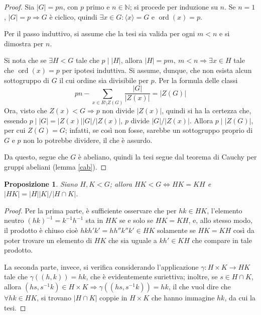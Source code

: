 \documentclass[12pt]{scrartcl}
\theoremstyle{style}
\newtheorem{prop}{Proposizione}[section]
\numberwithin{equation}{subsection}
\begin{document}
	\begin{proof}
		Sia $|G| = pn$, con $p$ primo e $n \in \mathbb{N}$; si procede per induzione su $n$.
		Se $n=1$, $|G| = p \Rightarrow G$ \`e ciclico, quindi $\exists x \in G : \langle x \rangle=G$ e $\operatorname{ord}(x) = p$.

		Per il passo induttivo, si assume che la tesi sia valida per ogni $ m < n$ e si dimostra per $n$.

Si nota che se $\exists  H < G$ tale che $p  \mid  \lvert H \rvert $, allora $|H|=pm , \ m < n \Rightarrow \exists x \in H$ tale che $\operatorname{ord}(x) =p$ per ipotesi induttiva.
Si assume, dunque, che non esista alcun sottogruppo di $G$ il cui ordine sia divisibile per $p$.
Per la formula delle classi
\[
pn - \sum_{x \in R\setminus Z(G)}^{} \frac{\lvert G \rvert }{|Z(x)|} = \lvert Z(G) \rvert 
\] 
Ora, visto che $Z(x) < G \Rightarrow p$ non divide $|Z(x)|$, quindi si ha la certezza che, essendo $p  \mid |G| = |Z(x)| |G|/|Z(x)|$, $p$ divide $|G|/|Z(x)|$. 
Allora $p  \mid  |Z(G)|$, per cui $Z(G) =G$; infatti, se cos\`i non fosse, sarebbe un sottogruppo proprio di $G$ e $p$ non lo potrebbe dividere, il che \`e assurdo.

Da questo, segue che $G$ \`e abeliano, quindi la tesi segue dal teorema di Cauchy per gruppi abeliani (lemma \ref{cab}).
	\end{proof}
\begin{prop}\label{tgen}
Siano $H,K < G$; allora $HK < G \iff HK = KH$ e $\lvert HK \rvert = \lvert H \rvert \lvert K \rvert / \lvert H \cap K \rvert $.
\end{prop}
\begin{proof}
Per la prima parte, \`e sufficiente osservare che per $hk \in HK$, l'elemento neutro $(hk)^{-1} = k^{-1} h^{-1} $ sta in $HK$ se e solo se $HK = KH$, e, allo stesso modo, il prodotto \`e chiuso cio\`e $hkh'k' = hh''k''k' \in HK$ solamente se $HK = KH$ cos\`i da poter trovare un elemento di $HK$ che sia uguale a $kh'\in KH$ che compare in tale prodotto.

La seconda parte, invece, si verifica considerando l'applicazione $\gamma: H \times K\to HK$ tale che $\gamma((h,k)) = hk$, che \`e evidentemente suriettiva; inoltre, se $s \in H \cap K$, allora $(hs,s^{-1}k) \in H \times K\Rightarrow \gamma ((hs,s^{-1}k)) = hk$, il che vuol dire che $\forall hk \in HK$, si trovano $|H\cap K|$ coppie in $H \times K$ che hanno immagine $hk$, da cui la tesi.
\end{proof}
\end{document}
